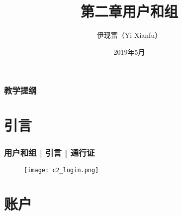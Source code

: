 



\title[用户和组]{第二章\quad 用户和组}
\author[Yixf]{伊现富（Yi Xianfu）}
\date{2019年5月}


\begin{frame}
  \titlepage
\end{frame}

\begin{frame}[plain,label=current]
  \frametitle{教学提纲}
  \setcounter{tocdepth}{3}
  \begin{multicols}{2}
    \tableofcontents
  \end{multicols}
\end{frame}

\section{引言}
\begin{frame}
  \frametitle{用户和组 | 引言 | 通行证}
  \begin{figure}
    \centering
    \texttt{[image: c2\_login.png]}
  \end{figure}
\end{frame}

\section{账户}
